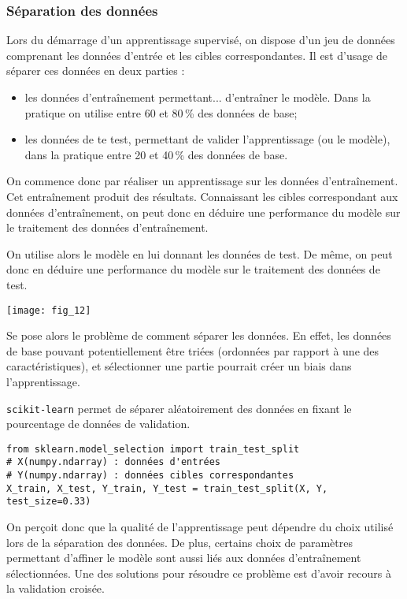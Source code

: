 \subsubsection{Séparation des données}
{
Lors du démarrage d'un apprentissage supervisé, on dispose d'un jeu de données comprenant les données d'entrée et les cibles correspondantes. Il est d'usage de séparer ces données en deux parties :
\begin{itemize}
\item les données d’entraînement permettant... d’entraîner le modèle. Dans la pratique on utilise entre 60 et 80\,\% des données de base;
\item les données de te test, permettant de valider l'apprentissage (ou le modèle), dans la pratique entre 20 et 40\,\% des données de base.
\end{itemize}

On commence donc par réaliser un apprentissage sur les données d’entraînement. Cet entraînement produit des résultats. Connaissant les cibles correspondant aux données d'entraînement, on peut donc en déduire une performance du modèle sur le traitement des données d’entraînement. 

On utilise alors le modèle en lui donnant les données de test. De même, on peut donc en déduire une performance du modèle sur le traitement des données de test.  

\begin{center}
\texttt{[image: fig\_12]}
\end{center}

 Se pose alors le problème de comment séparer les données. En effet, les données de base pouvant potentiellement être triées (ordonnées par rapport à une des caractéristiques), et sélectionner une partie pourrait créer un biais dans l'apprentissage. 

\texttt{scikit-learn} permet de séparer aléatoirement des données en fixant le pourcentage de données de validation.


\begin{lstlisting}
from sklearn.model_selection import train_test_split
# X(numpy.ndarray) : données d'entrées
# Y(numpy.ndarray) : données cibles correspondantes
X_train, X_test, Y_train, Y_test = train_test_split(X, Y, test_size=0.33)
\end{lstlisting}


On perçoit donc que la qualité de l'apprentissage peut dépendre du choix utilisé lors de la séparation des données. De plus, certains choix de paramètres permettant d’affiner le modèle sont aussi liés aux données d’entraînement sélectionnées. 
Une des solutions pour résoudre ce problème est d'avoir recours à la validation croisée. 

}
